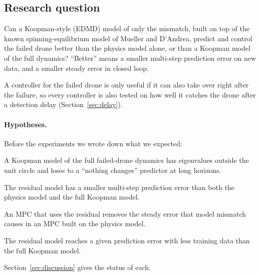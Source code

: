 \subsection{Research question}
\begin{description}[leftmargin=1.2em]
  \item[Research question.] Can a Koopman-style (EDMD) model of only the mismatch, built on top of the known spinning-equilibrium model of Mueller and D'Andrea, predict and control the failed drone better than the physics model alone, or than a Koopman model of the full dynamics? ``Better'' means a smaller multi-step prediction error on new data, and a smaller steady error in closed loop.
\end{description}
A controller for the failed drone is only useful if it can also take over right after the failure, so every controller is also tested on how well it catches the drone after a detection delay (Section~\ref{sec:delay}).

\paragraph{Hypotheses.} Before the experiments we wrote down what we expected:
\begin{description}[leftmargin=1.2em,itemsep=1pt]
  \item[H1.] A Koopman model of the full failed-drone dynamics has eigenvalues outside the unit circle and loses to a ``nothing changes'' predictor at long horizons.
  \item[H2.] The residual model has a smaller multi-step prediction error than both the physics model and the full Koopman model.
  \item[H3.] An MPC that uses the residual removes the steady error that model mismatch causes in an MPC built on the physics model.
  \item[H4.] The residual model reaches a given prediction error with less training data than the full Koopman model.
\end{description}
Section~\ref{sec:discussion} gives the status of each.

